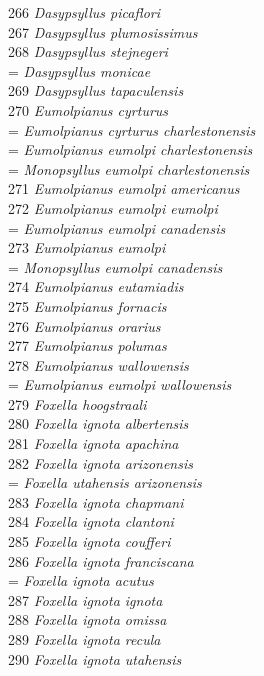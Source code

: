 \documentclass[
]{article}
\begin{document}
266 \emph{Dasypsyllus picaflori}\\
267 \emph{Dasypsyllus plumosissimus}\\
268 \emph{Dasypsyllus stejnegeri}\\
= \emph{Dasypsyllus monicae}\\
269 \emph{Dasypsyllus tapaculensis}\\
270 \emph{Eumolpianus cyrturus}\\
= \emph{Eumolpianus cyrturus charlestonensis}\\
= \emph{Eumolpianus eumolpi charlestonensis}\\
= \emph{Monopsyllus eumolpi charlestonensis}\\
271 \emph{Eumolpianus eumolpi americanus}\\
272 \emph{Eumolpianus eumolpi eumolpi}\\
= \emph{Eumolpianus eumolpi canadensis}\\
273 \emph{Eumolpianus eumolpi}\\
= \emph{Monopsyllus eumolpi canadensis}\\
274 \emph{Eumolpianus eutamiadis}\\
275 \emph{Eumolpianus fornacis}\\
276 \emph{Eumolpianus orarius}\\
277 \emph{Eumolpianus polumas}\\
278 \emph{Eumolpianus wallowensis}\\
= \emph{Eumolpianus eumolpi wallowensis}\\
279 \emph{Foxella hoogstraali}\\
280 \emph{Foxella ignota albertensis}\\
281 \emph{Foxella ignota apachina}\\
282 \emph{Foxella ignota arizonensis}\\
= \emph{Foxella utahensis arizonensis}\\
283 \emph{Foxella ignota chapmani}\\
284 \emph{Foxella ignota clantoni}\\
285 \emph{Foxella ignota coufferi}\\
286 \emph{Foxella ignota franciscana}\\
= \emph{Foxella ignota acutus}\\
287 \emph{Foxella ignota ignota}\\
288 \emph{Foxella ignota omissa}\\
289 \emph{Foxella ignota recula}\\
290 \emph{Foxella ignota utahensis}\\
\end{document}
